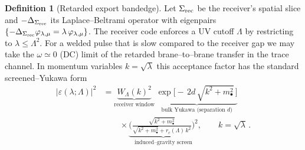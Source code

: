 \documentclass[10pt]{article}
\theoremstyle{definition}
\newtheorem{definition}{Definition}[section]
\theoremstyle{plain}
\begin{document}
\begin{definition}[Retarded export bandedge]
\label{def:retarded-bandedge}
Let $\Sigma_{\rm rec}$ be the receiver’s spatial slice and $-\Delta_{\Sigma_{\rm rec}}$ its Laplace–Beltrami
operator with eigenpairs $\{-\Delta_{\Sigma_{\rm rec}}\varphi_{\lambda,\mu}=\lambda\,\varphi_{\lambda,\mu}\}$.
The receiver code enforces a UV cutoff $\Lambda$ by restricting to $\lambda\le \Lambda^2$.
For a welded pulse that is slow compared to the receiver gap we may take the $\omega\simeq 0$ (DC) limit
of the retarded brane–to–brane transfer in the trace channel. In momentum variables
$k=\sqrt{\lambda}$ this acceptance factor has the standard screened–Yukawa form
\begin{equation}
\label{eq:ret-accept}
\begin{aligned}
\big|\varepsilon(\lambda;\Lambda)\big|^2
&= \underbrace{W_\Lambda(k)^2}_{\text{receiver window}}\,
   \underbrace{\exp\!\big[-\,2d\,\sqrt{k^2+m_\bullet^2}\,\big]}_{\text{bulk Yukawa (separation $d$)}}
\\[-2pt]
&\qquad\times
   \underbrace{\Bigg(\frac{\sqrt{k^2+m_\bullet^2}}{\sqrt{k^2+m_\bullet^2}+r_c(\Lambda)\,k^2}\Bigg)^{\!2}}_{\text{induced--gravity screen}},
\qquad k=\sqrt{\lambda}\,.
\end{aligned}
\end{equation}


\end{definition}
\end{document}
